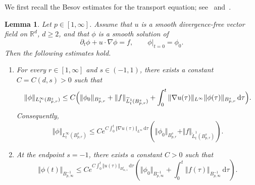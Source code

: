 \documentclass[reqno,11pt,a4paper]{amsart}
\newtheorem{lemma}[theorem]{Lemma}
\newcommand{\R}{\ensuremath{\mathbb{R}}}
\newcommand{\dd}{\mathrm{d}}
\begin{document}
We first recall the Besov estimates
for the transport equation;
see~\cite{BCD11}
and~\cite[Proposition~4.1]{HKR10}.
\begin{lemma}\label{lem:TE-prog-es}
Let $p\in[1,\infty]$.
Assume that $u$ is a smooth divergence-free vector field
on $\R^d$, $d\geq2$, and that $\phi$ is a smooth solution of
\[
  \partial_t\phi+u\cdot\nabla\phi=f,
  \qquad
  \phi|_{t=0}=\phi_0.
\]
Then the following estimates hold.
\begin{enumerate}[(1)]
\item
For every $r\in[1,\infty]$ and $s\in(-1,1)$,
there exists a constant $C=C(d,s)>0$ such that
\begin{equation}\label{eq:T-BesEs0}
\begin{aligned}
  \Vert \phi\Vert _{L^\infty_t(B^s_{p,r})}
  \leq C\Bigl(
    \Vert \phi_0\Vert _{B^s_{p,r}}
    +\Vert f\Vert _{\widetilde L^1_t(B^s_{p,r})}
    +\int_0^t
    \Vert \nabla u(\tau)\Vert _{L^\infty}
    \Vert \phi(\tau)\Vert _{B^s_{p,r}}\,\dd\tau
  \Bigr).
\end{aligned}
\end{equation}
Consequently,
\begin{equation}\label{eq:T-BesEs}
  \Vert \phi\Vert _{L^\infty_t(B^s_{p,r})}
  \leq
  Ce^{C\int_0^t\Vert \nabla u(\tau)\Vert _{L^\infty}\,\dd\tau}
  \left(
    \Vert \phi_0\Vert _{B^s_{p,r}}
    +\Vert f\Vert _{\widetilde L^1_t(B^s_{p,r})}
  \right).
\end{equation}

\item
At the endpoint $s=-1$, there exists a constant $C>0$
such that
\begin{equation}\label{eq:TE-prog-es3}
  \Vert \phi(t)\Vert _{B^{-1}_{p,\infty}}
  \leq
  Ce^{C\int_0^t\Vert u(\tau)\Vert _{B^1_{\infty,1}}\,\dd\tau}
  \left(
    \Vert \phi_0\Vert _{B^{-1}_{p,\infty}}
    +\int_0^t
    \Vert f(\tau)\Vert _{B^{-1}_{p,\infty}}\,\dd\tau
  \right).
\end{equation}
\end{enumerate}
\end{lemma}
\end{document}
